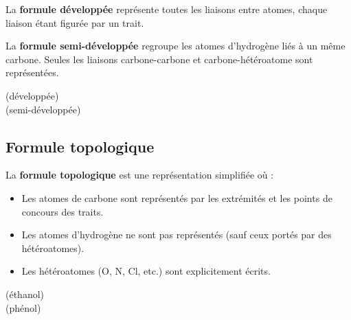 \begin{definition}
La \textbf{formule développée} représente toutes les liaisons entre atomes, chaque liaison étant figurée par un trait.
\end{definition}

\begin{definition}
La \textbf{formule semi-développée} regroupe les atomes d'hydrogène liés à un même carbone. Seules les liaisons carbone-carbone et carbone-hétéroatome sont représentées.
\end{definition}

\begin{exemple}
\begin{center}
\begin{illus}
 \quad (développée)\\[4pt]
 \quad (semi-développée)
\end{illus}
\end{center}
\end{exemple}

\subsection{Formule topologique}

\begin{definition}
La \textbf{formule topologique} est une représentation simplifiée où :
\begin{itemize}
    \item Les atomes de carbone sont représentés par les extrémités et les points de concours des traits.
    \item Les atomes d'hydrogène ne sont pas représentés (sauf ceux portés par des hétéroatomes).
    \item Les hétéroatomes (O, N, Cl, etc.) sont explicitement écrits.
\end{itemize}
\end{definition}

\begin{exemple}
\begin{center}
\begin{illus}
 \quad (éthanol)\\[4pt]
 \quad (phénol)
\end{illus}
\end{center}
\end{exemple}

